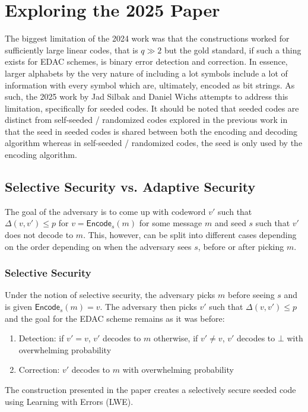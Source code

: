 \documentclass[12pt]{article}%
\begin{document}
\section{Exploring the 2025 Paper}

The biggest limitation of the 2024 work was that the constructions worked for sufficiently 
 large linear codes, that is $q \gg 2$ but the gold standard, if such a thing exists for EDAC schemes, is binary error detection and correction. In essence, larger alphabets by the very nature of including a lot symbols include a lot of information with every symbol which are, ultimately, encoded as bit strings. As such, the 2025 work by Jad Silbak and Daniel Wichs attempts to address this limitation, specifically for seeded codes. It should be noted that seeded codes are distinct from self-seeded / randomized codes explored in the previous work in that the seed in seeded codes is shared between both the encoding and decoding algorithm whereas in self-seeded / randomized codes, the seed is only used by the encoding algorithm. 

 \subsection{Selective Security vs. Adaptive Security}

 The goal of the adversary is to come up with codeword $v'$ such that $\Delta(v, v') \leq p$ for $v = \mathsf{Encode}_s(m)$ for some message $m$ and seed $s$ such that $v'$ does not decode to $m$. This, however, can be split into different cases depending on the order depending on when the adversary sees $s$, before or after picking $m$. 

 \subsubsection{Selective Security}

  Under the notion of selective security, the adversary picks $m$ before seeing $s$ and is given $\mathsf{Encode}_s(m) = v$. The adversary then picks $v'$ such that $\Delta(v, v') \leq p$ and the goal for the EDAC scheme remains as it was before: \begin{enumerate}
      \item Detection: if $v' = v$, $v'$ decodes to $m$ otherwise, if $v' \neq v$, $v'$ decodes to $\bot$ with overwhelming probability
      \item Correction: $v'$ decodes to $m$ with overwhelming probability 
  \end{enumerate} The construction presented in the paper creates a selectively secure seeded code using Learning with Errors (LWE). 
\end{document}
